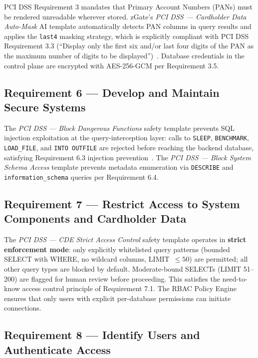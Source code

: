 PCI DSS Requirement 3 mandates that Primary Account Numbers (PANs) must be rendered unreadable wherever stored. zGate's \textit{PCI DSS --- Cardholder Data Auto-Mask} AI template automatically detects PAN columns in query results and applies the \texttt{last4} masking strategy, which is explicitly compliant with PCI DSS Requirement 3.3 (``Display only the first six and/or last four digits of the PAN as the maximum number of digits to be displayed'')~\cite{pci-dss-v4}. Database credentials in the control plane are encrypted with AES-256-GCM per Requirement 3.5.

\subsection{Requirement 6 --- Develop and Maintain Secure Systems}

The \textit{PCI DSS --- Block Dangerous Functions} safety template prevents SQL injection exploitation at the query-interception layer: calls to \texttt{SLEEP}, \texttt{BENCHMARK}, \texttt{LOAD\_FILE}, and \texttt{INTO OUTFILE} are rejected before reaching the backend database, satisfying Requirement 6.3 injection prevention~\cite{pci-dss-v4}. The \textit{PCI DSS --- Block System Schema Access} template prevents metadata enumeration via \texttt{DESCRIBE} and \texttt{information\_schema} queries per Requirement 6.4.

\subsection{Requirement 7 --- Restrict Access to System Components and Cardholder Data}

The \textit{PCI DSS --- CDE Strict Access Control} safety template operates in \textbf{strict enforcement mode}: only explicitly whitelisted query patterns (bounded SELECT with WHERE, no wildcard columns, LIMIT~$\leq 50$) are permitted; all other query types are blocked by default. Moderate-bound SELECTs (LIMIT 51--200) are flagged for human review before proceeding. This satisfies the need-to-know access control principle of Requirement 7.1. The RBAC Policy Engine ensures that only users with explicit per-database permissions can initiate connections.

\subsection{Requirement 8 --- Identify Users and Authenticate Access}

